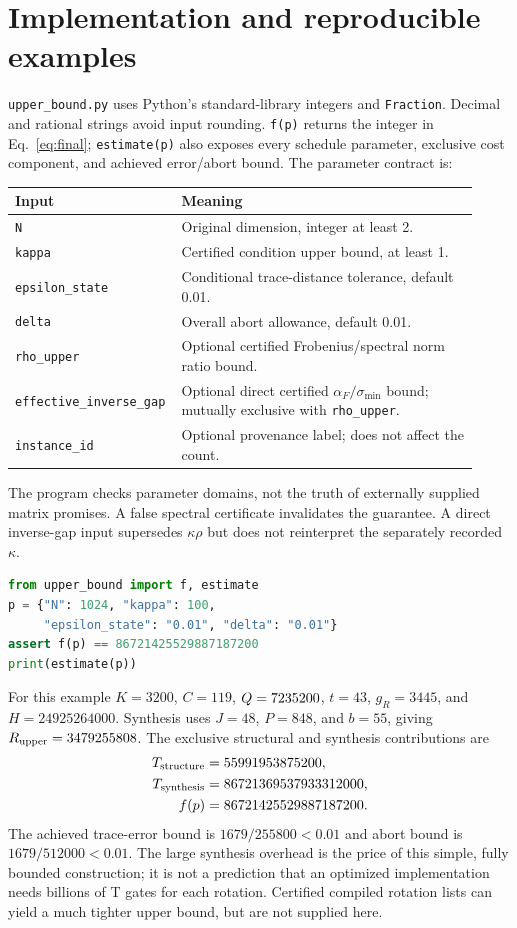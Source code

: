\documentclass[11pt]{article}
\begin{document}
\section{Implementation and reproducible examples}
\texttt{upper\_bound.py} uses Python's standard-library integers and \texttt{Fraction}. Decimal and rational strings avoid input rounding. \texttt{f(p)} returns the integer in Eq.~\eqref{eq:final}; \texttt{estimate(p)} also exposes every schedule parameter, exclusive cost component, and achieved error/abort bound. The parameter contract is:
\begin{center}\small
\begin{tabular}{p{0.29\linewidth}p{0.63\linewidth}}
\toprule
Input & Meaning\\\midrule
\texttt{N} & Original dimension, integer at least 2.\\
\texttt{kappa} & Certified condition upper bound, at least 1.\\
\texttt{epsilon\_state} & Conditional trace-distance tolerance, default 0.01.\\
\texttt{delta} & Overall abort allowance, default 0.01.\\
\texttt{rho\_upper} & Optional certified Frobenius/spectral norm ratio bound.\\
\texttt{effective\_inverse\_gap} & Optional direct certified $\alpha_F/\sigma_{\min}$ bound; mutually exclusive with \texttt{rho\_upper}.\\
\texttt{instance\_id} & Optional provenance label; does not affect the count.\\
\bottomrule
\end{tabular}
\end{center}
The program checks parameter domains, not the truth of externally supplied matrix promises. A false spectral certificate invalidates the guarantee. A direct inverse-gap input supersedes $\kappa\rho$ but does not reinterpret the separately recorded $\kappa$.
\begin{lstlisting}[language=Python]
from upper_bound import f, estimate
p = {"N": 1024, "kappa": 100,
     "epsilon_state": "0.01", "delta": "0.01"}
assert f(p) == 86721425529887187200
print(estimate(p))
\end{lstlisting}
For this example $K=3200$, $C=119$, $Q=7235200$, $t=43$, $g_R=3445$, and $H=24925264000$. Synthesis uses $J=48$, $P=848$, and $b=55$, giving $R_{\rm upper}=3479255808$. The exclusive structural and synthesis contributions are
\begin{align}
 T_{\rm structure}&=55991953875200,\\
 T_{\rm synthesis}&=86721369537933312000,\\
 f(p)&=86721425529887187200.
\end{align}
The achieved trace-error bound is $1679/255800<0.01$ and abort bound is $1679/512000<0.01$. The large synthesis overhead is the price of this simple, fully bounded construction; it is not a prediction that an optimized implementation needs billions of T gates for each rotation. Certified compiled rotation lists can yield a much tighter upper bound, but are not supplied here.
\end{document}
